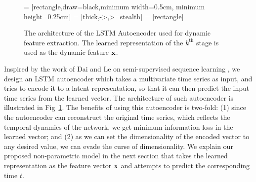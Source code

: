 \begin{figure}
	\centering
	\footnotesize
	 = [rectangle,draw=black,minimum width=0.5cm, minimum height=0.25cm]
	 = [thick,->,>=stealth]
	 = [rectangle]
	\caption{The architecture of the LSTM Autoencoder used for dynamic feature extraction. The learned representation of the $k^{\text{th}}$ stage is used as the dynamic feature $\mathbf{x}$.}
	\label{fig:autoencoder}
\end{figure}

Inspired by the work of Dai and Le on semi-supervised sequence learning \cite{dai2015semi}, we design an LSTM autoencoder which takes a multivariate time series as input, and tries to encode it to a latent representation, so that it can then predict the input time series from the learned vector. The architecture of such autoencoder is illustrated in Fig~\ref{fig:autoencoder}. The benefits of using this autoencoder is two-fold: (1) since the autoencoder can reconstruct the original time series, which reflects the temporal dynamics of the network, we get minimum information loss in the learned vector; and (2) as we can set the dimensionality of the encoded vector to any desired value, we can evade the curse of dimensionality. We explain our proposed non-parametric model in the next section that takes the learned representation as the feature vector $\mathbf{x}$ and attempts to predict the corresponding time $t$. 


